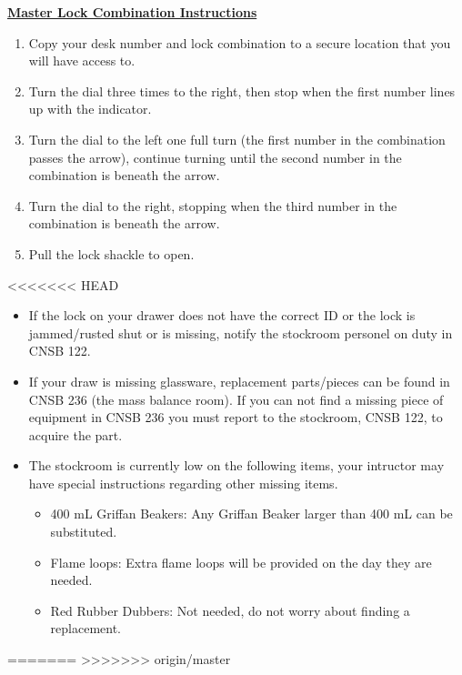 \documentclass[12pt]{article}
\begin{document}
\begin{minipage}{0.4\textwidth}
\underline{{\large \textbf{Master Lock Combination Instructions}}}
\begin{enumerate}
\item Copy your desk number and lock combination to a secure location that you will have access to.
\item Turn the dial three times to the right, then stop when the first number lines up with the indicator.
\item Turn the dial to the left one full turn (the first number in the combination passes the arrow), continue turning until the second number in the combination is beneath the arrow.
\item Turn the dial to the right, stopping when the third number in the combination is beneath the arrow.
\item Pull the lock shackle to open.
\end{enumerate}
\end{minipage}
<<<<<<< HEAD
\begin{itemize}
\item If the lock on your drawer does not have the correct ID or the lock is jammed/rusted shut or is missing, notify the stockroom personel on duty in CNSB 122.
\item If your draw is missing glassware, replacement parts/pieces can be found in CNSB 236 (the mass balance room). If you can not find a missing piece of equipment in CNSB 236 you must report to the stockroom, CNSB 122, to acquire the part.
\item The stockroom is currently low on the following items, your intructor may have special instructions regarding other missing items.
\begin{itemize}
\item 400 mL Griffan Beakers: Any Griffan Beaker larger than 400 mL can be substituted.
\item Flame loops: Extra flame loops will be provided on the day they are needed.
\item Red Rubber Dubbers: Not needed, do not worry about finding a replacement.
\end{itemize}
\end{itemize}
=======
>>>>>>> origin/master
\end{document}
